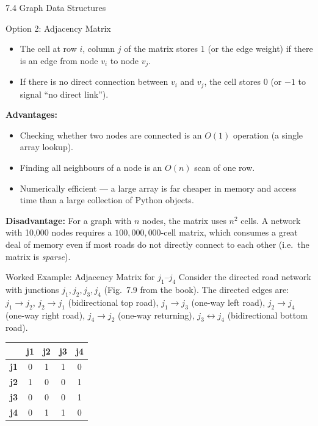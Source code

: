\documentclass[aspectratio=169,10pt]{beamer}
\begin{document}
\begin{frame}[allowframebreaks]{7.4 Graph Data Structures}
\begin{block}{Option 2: Adjacency Matrix}
    \begin{itemize}
      \item The cell at row $i$, column $j$ of the matrix stores $1$
            (or the edge weight) if there is an edge from node $v_i$
            to node $v_j$.
      \item If there is no direct connection between $v_i$ and $v_j$,
            the cell stores $0$ (or $-1$ to signal ``no direct link'').
    \end{itemize}

    \textbf{Advantages:}
    \begin{itemize}
      \item Checking whether two nodes are connected is an $O(1)$
            operation (a single array lookup).
      \item Finding all neighbours of a node is an $O(n)$ scan
            of one row.
      \item Numerically efficient --- a large array is far cheaper
            in memory and access time than a large collection of
            Python objects.
    \end{itemize}

    \textbf{Disadvantage:} For a graph with $n$ nodes, the matrix
    uses $n^2$ cells.  A network with 10{,}000 nodes requires a
    $100{,}000{,}000$-cell matrix, which consumes a great deal of
    memory even if most roads do not directly connect to each other
    (i.e.\ the matrix is \emph{sparse}).
  \end{block}

  \framebreak

  \begin{exampleblock}{Worked Example: Adjacency Matrix for $j_1$--$j_4$}
    Consider the directed road network with junctions $j_1, j_2, j_3, j_4$
    (Fig.~7.9 from the book).  The directed edges are:
    $j_1 \to j_2$,\; $j_2 \to j_1$ (bidirectional top road),\;
    $j_1 \to j_3$ (one-way left road),\;
    $j_2 \to j_4$ (one-way right road),\;
    $j_4 \to j_2$ (one-way returning),\;
    $j_3 \leftrightarrow j_4$ (bidirectional bottom road).

    \vspace{0.4em}
    \renewcommand{\arraystretch}{1.3}
    \begin{tabular}{c|cccc}
      & \textbf{j1} & \textbf{j2} & \textbf{j3} & \textbf{j4} \\
      \hline
      \textbf{j1} & 0 & 1 & 1 & 0 \\
      \textbf{j2} & 1 & 0 & 0 & 1 \\
      \textbf{j3} & 0 & 0 & 0 & 1 \\
      \textbf{j4} & 0 & 1 & 1 & 0 \\
    \end{tabular}
    \vspace{0.4em}


\end{exampleblock}
\end{frame}
\end{document}
